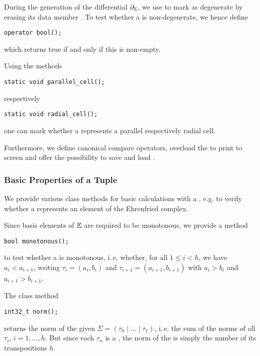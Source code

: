 During the generation of the differential $\partial_\mathbb E$, we use to mark  as degenerate by
erasing its data member .
To test whether a  is non-degenerate, we hence define  
\begin{lstlisting}
operator bool();
\end{lstlisting}
which returns true if and only if this  is non-empty.

Using the methods
\begin{lstlisting}
static void parallel_cell(); 
\end{lstlisting}
respectively
\begin{lstlisting}
static void radial_cell();
\end{lstlisting}
one can mark whether a  represents a parallel respectively radial cell.

Furthermore, we define canonical compare operators, 
overload the  to print  to screen
and offer the possibility to save and load .

\subsubsection{Basic Properties of a Tuple}\label{program:kappa:tuple:basics}

We provide various class methods for basic calculations with a ,
e.g. to verify whether a  represents an element of the Ehrenfried complex. 

Since basis elements of $\mathbb E$ are required to be monotonous, we provide a method
\begin{lstlisting}
bool monotonous();
\end{lstlisting}
to test whether a  is monotonous, i.\,e. whether, for all $1 \leq i < h$, we have $a_i < a_{i+1}$, 
writing $\tau_i = (a_i, b_i)$ and $\tau_{i+1} = (a_{i+1}, b_{i+1})$ with $a_i > b_i$ and $a_{i+1} > b_{i+1}$.

The class method
\begin{lstlisting}
int32_t norm();
\end{lstlisting}
returns the norm of the given  $\Sigma = (\tau_h \mid \ldots \mid \tau_1)$, 
i.\,e. the sum of the norms of all $\tau_i$, $i = 1, \dotsc, h$. 
But since each $\tau_n$ is a , the norm of the  is simply the number of its transpositions $h$. 

